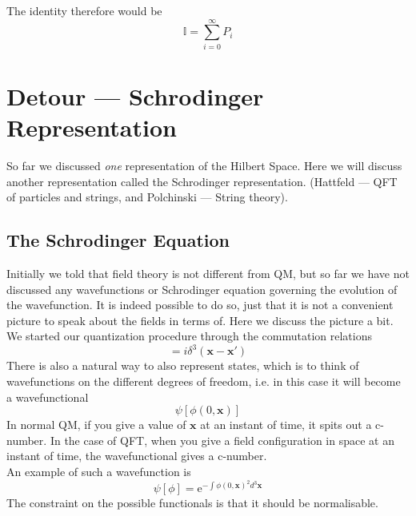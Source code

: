 \documentclass[11pt]{article}
\newcommand{\e}{\mathrm{e}}
\numberwithin{equation}{section}
\begin{document}
    The identity therefore would be 
    \begin{equation*}
        \mathbb{I} = \sum_{i=0}^\infty P_i
    \end{equation*}
    
    \newpage
    \section{Detour — Schrodinger Representation}
    So far we discussed \textit{one} representation of the Hilbert Space. Here we will discuss another representation called the Schrodinger representation. (Hattfeld — QFT of particles and strings, and Polchinski — String theory).

    \subsection{The Schrodinger Equation}

    Initially we told that field theory is not different from QM, but so far we have not discussed any wavefunctions or Schrodinger equation governing the evolution of the wavefunction. It is indeed possible to do so, just that it is not a convenient picture to speak about the fields in terms of. Here we discuss the picture a bit.\\

    We started our quantization procedure through the commutation relations
    \begin{equation}
        [\phi(0, \textbf{x}), \Pi(0, \textbf{x}')] = i\delta^3(\textbf{x} - \textbf{x}')
    \end{equation}
    There is also a natural way to also represent states, which is to think of wavefunctions on the different degrees of freedom, i.e. in this case it will become a wavefunctional 
    \begin{equation}
        \psi[\phi(0,\textbf{x})]
    \end{equation}
    In normal QM, if you give a value of \(\textbf{x}\) at an instant of time, it spits out a c-number. In the case of QFT, when you give a field configuration in space at an instant of time, the wavefunctional gives a c-number. \\

    An example of such a wavefunction is 
    \begin{equation}
        \psi[\phi] = \e^{-\int \phi(0, \textbf{x})^2d^3\textbf{x}}
    \end{equation}
    The constraint on the possible functionals is that it should be normalisable.\\
\end{document}
